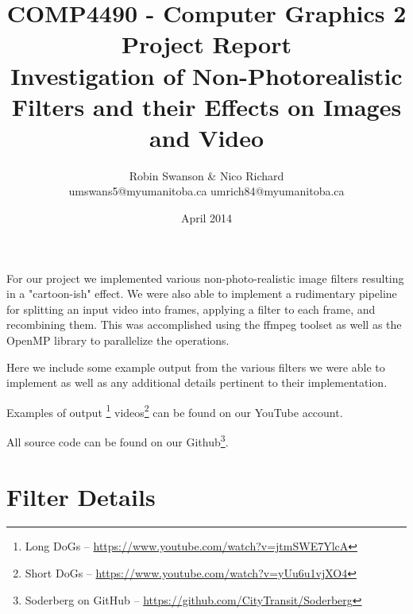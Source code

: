 \documentclass[10pt]{article}
\title{COMP4490 - Computer Graphics 2 \\ Project Report \\ Investigation of Non-Photorealistic Filters and their Effects on Images and Video}
\author{Robin Swanson \& Nico Richard\\ umswans5@myumanitoba.ca umrich84@myumanitoba.ca}
\date{April 2014}
\begin{document}
\maketitle

For our project we implemented various non-photo-realistic image filters resulting in a "cartoon-ish" effect. We were also able to implement a rudimentary pipeline for splitting an input video into frames, applying a filter to each frame, and recombining them. This was accomplished using the ffmpeg toolset as well as the OpenMP library to parallelize the operations.

Here we include some example output from the various filters we were able to implement as well as any additional details pertinent to their implementation.

Examples of output \footnote{Long DoGs -- \url{https://www.youtube.com/watch?v=jtmSWE7YlcA}} videos\footnote{Short DoGs -- \url{https://www.youtube.com/watch?v=yUu6u1vjXO4}} can be found on our YouTube account.

All source code can be found on our Github\footnote{Soderberg on GitHub -- \url{https://github.com/CityTransit/Soderberg}}.

\section{Filter Details}
\end{document}
